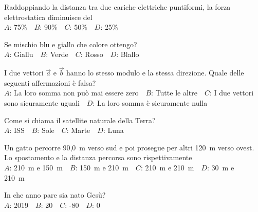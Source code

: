 \mcquestionfooter



\def\mcquestionnumber{7}


\mcquestionheader Raddoppiando la distanza tra due cariche elettriche puntiformi, la forza elettrostatica diminuisce del\\
{$A$}: 75\%\ \ {$B$}: 90\%\ \ {$C$}: 50\%\ \ {$D$}: 25\%\ \ 

\mcquestionfooter



\def\mcquestionnumber{8}


\mcquestionheader Se mischio blu e giallo che colore ottengo?\\
{$A$}: Giallu\ \ {$B$}: Verde\ \ {$C$}: Rosso\ \ {$D$}: Blallo\ \ 

\mcquestionfooter



\def\mcquestionnumber{9}


\mcquestionheader I due vettori $\vec{a}$ e $\vec{b}$ hanno lo stesso modulo e la stessa direzione. Quale delle seguenti affermazioni è falsa?\\
{$A$}: La loro somma non può mai essere zero\ \ {$B$}: Tutte le altre\ \ {$C$}: I due vettori sono sicuramente uguali\ \ {$D$}: La loro somma è sicuramente nulla\ \ 

\mcquestionfooter



\def\mcquestionnumber{10}


\mcquestionheader Come si chiama il satellite naturale della Terra?\\
{$A$}: ISS\ \ {$B$}: Sole\ \ {$C$}: Marte\ \ {$D$}: Luna\ \ 

\mcquestionfooter



\def\mcquestionnumber{11}


\mcquestionheader Un gatto percorre 90,0~m verso sud e poi prosegue per altri 120~m verso ovest. Lo spostamento e la distanza percorsa sono rispettivamente\\
{$A$}: 210~m e 150~m\ \ {$B$}: 150~m e 210~m\ \ {$C$}: 210~m e 210~m\ \ {$D$}: 30~m e 210~m\ \ 

\mcquestionfooter



\def\mcquestionnumber{12}


\mcquestionheader In che anno pare sia nato Gesù?\\
{$A$}: 2019\ \ {$B$}: 20\ \ {$C$}: -80\ \ {$D$}: 0\ \ 

